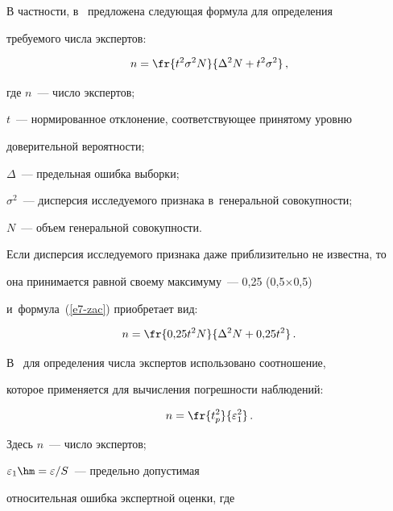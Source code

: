   

  В частности, в~\cite{9-zac} предложена следующая формула для определения 

тре\-бу\-емо\-го числа экспертов:

  \begin{equation}

  n=\fr{t^2\sigma^2 N}{\Delta^2N+t^2\sigma^2}\,,

  \label{e7-zac}

  \end{equation}

где $n$~--- число экспертов;

$t$~--- нормированное отклонение, соответствующее принятому уровню 

доверительной вероятности;

$\Delta$~--- предельная ошибка выборки;

$\sigma^2$~--- дисперсия исследуемого признака в~генеральной совокупности;

$N$~--- объем генеральной совокупности.

  

  Если дисперсия исследуемого признака даже приблизительно не известна, то 

она принимается равной своему максимуму~--- 0,25 (0,5$\times$0,5) 

и~формула~(\ref{e7-zac}) приобретает вид:

  \begin{equation}

  n=\fr{0{,}25 t^2N}{\Delta^2 N+0{,}25 t^2}\,.

  \label{e8-zac}

  \end{equation}

  

  В~\cite{10-zac} для определения числа экспертов использовано соотношение, 

которое применяется для вычисления погрешности наблюдений:

  \begin{equation}

  n=\fr{t_p^2}{\varepsilon_1^2}\,.

  \label{e9-zac}

  \end{equation}

Здесь $n$~--- число экспертов;

$\varepsilon_1\hm= \varepsilon/S$~--- предельно допустимая 

относительная ошибка экспертной оценки, где

